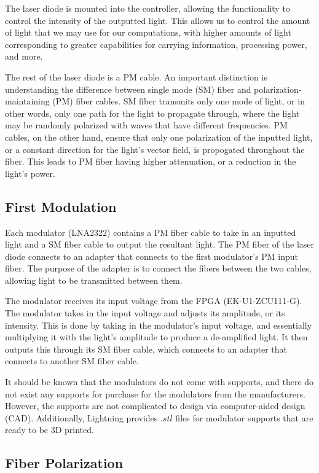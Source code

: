 \documentclass[11pt]{article}
\begin{document}
The laser diode is mounted into the controller, allowing the functionality to control the intensity of the outputted light. This allows us to control the amount of light that we may use for our computations, with higher amounts of light corresponding to greater capabilities for carrying information, processing power, and more.

The rest of the laser diode is a PM cable. An important distinction is understanding the difference between single mode (SM) fiber and polarization-maintaining (PM) fiber cables. SM fiber transmits only one mode of light, or in other words, only one path for the light to propagate through, where the light may be randomly polarized with waves that have different frequencies. PM cables, on the other hand, ensure that only one polarization of the inputted light, or a constant direction for the light's vector field, is propogated throughout the fiber. This leads to PM fiber having higher attenuation, or a reduction in the light's power.

\subsection{First Modulation}

Each modulator (LNA2322) contains a PM fiber cable to take in an inputted light and a SM fiber cable to output the resultant light. The PM fiber of the laser diode connects to an adapter that connects to the first modulator's PM input fiber. The purpose of the adapter is to connect the fibers between the two cables, allowing light to be transmitted between them.

The modulator receives its input voltage from the FPGA (EK-U1-ZCU111-G). The modulator takes in the input voltage and adjusts its amplitude, or its intensity. This is done by taking in the modulator's input voltage, and essentially multiplying it with the light's amplitude to produce a de-amplified light. It then outputs this through its SM fiber cable, which connects to an adapter that connects to another SM fiber cable. 

It should be known that the modulators do not come with supports, and there do not exist any supports for purchase for the modulators from the manufacturers. However, the supports are not complicated to design via computer-aided design (CAD). Additionally, Lightning provides $.stl$ files for modulator supports that are ready to be 3D printed.

\subsection{Fiber Polarization}
\end{document}
